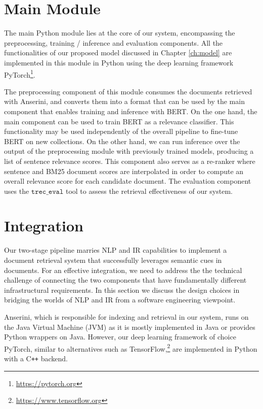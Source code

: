 \section{Main Module}

The main Python module lies at the core of our system, encompassing the preprocessing, training / inference and evaluation components.
All the functionalities of our proposed model discussed in Chapter \ref{ch:model} are implemented in this module in Python using the deep learning framework PyTorch\footnote{\url{https://pytorch.org}}.

The preprocessing component of this module consumes the documents retrieved with Anserini, and converts them into a format that can be used by the main component that enables training and inference with BERT.
On the one hand, the main component can be used to train BERT as a relevance classifier.
This functionality may be used independently of the overall pipeline to fine-tune BERT on new collections.
On the other hand, we can run inference over the output of the preprocessing module with previously trained models, producing a list of sentence relevance scores.
This component also serves as a re-ranker where sentence and BM25 document scores are interpolated in order to compute an overall relevance score for each candidate document.
The evaluation component uses the $\texttt{trec\_eval}$ tool to assess the retrieval effectiveness of our system.

\section{Integration}

Our two-stage pipeline marries NLP and IR capabilities to implement a document retrieval system that successfully leverages semantic cues in documents.
For an effective integration, we need to address the the technical challenge of connecting the two components that have fundamentally different infrastructural requirements.
In this section we discuss the design choices in bridging the worlds of NLP and IR from a software engineering viewpoint.

Anserini, which is responsible for indexing and retrieval in our system, runs on the Java Virtual Machine (JVM) as it is mostly implemented in Java or provides Python wrappers on Java.
However, our deep learning framework of choice PyTorch, similar to alternatives such as TensorFlow,\footnote{\url{https://www.tensorflow.org}} are implemented in Python with a C\texttt{++} backend.

